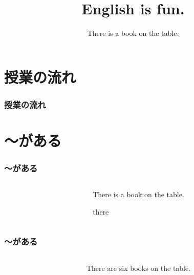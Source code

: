 \documentclass[aspectratio=169,xcolor={dvipsnames,table}]{beamer}
\title{English is fun.}
\subtitle{There is a book on the table.}
\author{}
\institute[]{}
\date[]
\newcommand{\myaudio}[1]{\href{#1}{\faVolumeUp}}
\begin{document}
\begin{frame}[plain]
  \titlepage
\end{frame}

\section*{授業の流れ}
\begin{frame}[plain]
  \frametitle{授業の流れ}
  \tableofcontents
\end{frame}

\section{〜がある}

\begin{frame}[plain]\frametitle{〜がある}
\begin{columns}[T]
\begin{column}{.4\textwidth}
\end{column}\pause
\begin{column}{.55\textwidth}\LARGE
There is a book on the table.

\hfill{\small there }
\end{column}
\end{columns}
\vfill
\mbox{}\hfill\myaudio{./audio/001_there_is_01.mp3}

\end{frame}
\begin{frame}[plain]\frametitle{〜がある}
\begin{columns}
\begin{column}{.3\textwidth}
\end{column}\pause
\begin{column}{.65\textwidth}\LARGE
There are six books on the table.
\end{column}
\end{columns}
\vfill
\mbox{}\hfill\myaudio{./audio/001_there_is_02.mp3}
\end{frame}
\end{document}
